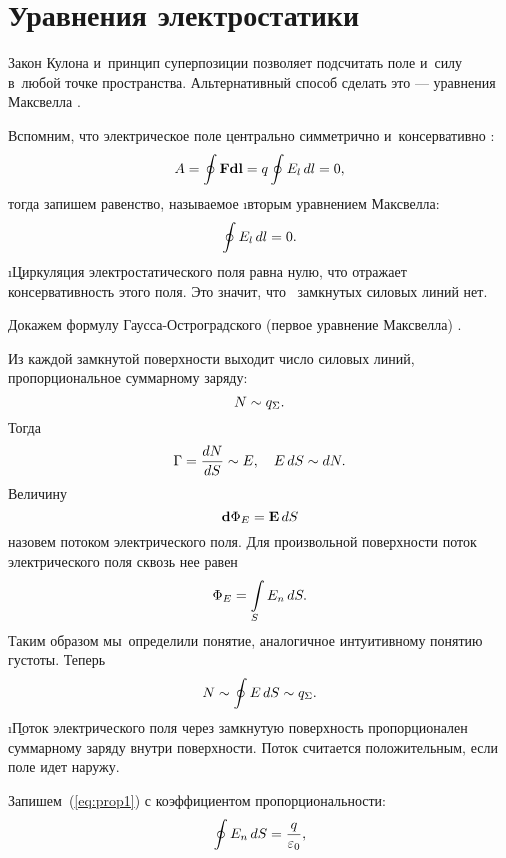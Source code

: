 \section{Уравнения электростатики}

	Закон Кулона  и~принцип суперпозиции  позволяет подсчитать поле  и~силу в~любой точке пространства. Альтернативный способ сделать это --- уравнения Максвелла . \par
	Вспомним, что электрическое поле центрально симметрично и~консервативно :
		$$A=\oint \text{\textbf{F}} \textbf{d}\text{\textbf{l}}=q\oint E_l\,d l=0,$$
	тогда запишем равенство, называемое \i{вторым уравнением Максвелла}:
		\begin{equation}
			\oint E_l\,d l =0.
		\end{equation}
	\i{\b{Циркуляция  электростатического поля равна нулю, что отражает консервативность этого поля}}. Это значит, что \, замкнутых силовых линий нет.\par
	Докажем формулу Гаусса-Остроградского  (первое уравнение Максвелла) .\par
	Из каждой замкнутой поверхности выходит число силовых линий, пропорциональное суммарному заряду:
		$$N\sim q_{\Sigma}.$$
	Тогда
		$$\Gamma=\frac{dN}{dS}\sim E, \quad E\, dS\sim dN.$$
	Величину 
		$$\textbf{d}{\Phi_E}=\text{\textbf{E}}\,d S$$
	назовем потоком электрического поля. Для произвольной поверхности поток электрического поля сквозь нее равен
		\begin{equation}
			\Phi_E=\int\limits_S E_n\,d S.
		\end{equation}
	Таким образом мы~определили понятие, аналогичное интуитивному понятию густоты. Теперь
		\begin{equation}\label{eq:prop1}
			N\sim\oint E\,d S\sim q_{\Sigma}.
		\end{equation}
	\i{\b{Поток электрического поля через замкнутую поверхность пропорционален суммарному заряду внутри поверхности.}} Поток считается положительным, если поле идет наружу.\par
	Запишем~(\ref{eq:prop1}) с коэффициентом пропорциональности:
		\begin{equation}
			\oint E_n\,d S=\frac{q}{\varepsilon_0},
		\end{equation}
